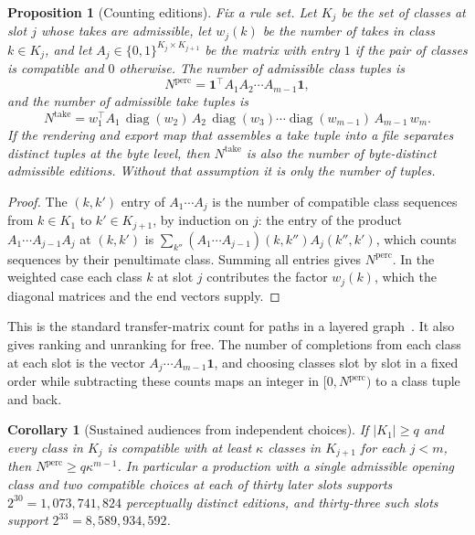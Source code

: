 \documentclass[11pt,twoside,openright]{book}
\theoremstyle{plain}
\newtheorem{proposition}[theorem]{Proposition}
\newtheorem{corollary}[theorem]{Corollary}
\theoremstyle{definition}
\theoremstyle{remark}
\newcommand{\one}{\mathbf{1}}
\DeclareMathOperator{\diag}{diag}
\begin{document}
\begin{proposition}[Counting editions]\label{prop:count}
Fix a rule set. Let $K_j$ be the set of classes at slot $j$ whose takes are admissible, let $w_j(k)$ be the number of takes in class $k\in K_j$, and let $A_j\in\{0,1\}^{K_j\times K_{j+1}}$ be the matrix with entry $1$ if the pair of classes is compatible and $0$ otherwise. The number of admissible class tuples is
\[
N^{\mathrm{perc}}=\one^{\!\top}A_1A_2\cdots A_{m-1}\one,
\]
and the number of admissible take tuples is
\[
N^{\mathrm{take}}=w_1^{\!\top}A_1\,\diag(w_2)\,A_2\,\diag(w_3)\cdots\diag(w_{m-1})\,A_{m-1}\,w_m .
\]
If the rendering and export map that assembles a take tuple into a file separates distinct tuples at the byte level, then $N^{\mathrm{take}}$ is also the number of byte-distinct admissible editions. Without that assumption it is only the number of tuples.
\end{proposition}

\begin{proof}
The $(k,k')$ entry of $A_1\cdots A_{j}$ is the number of compatible class sequences from $k\in K_1$ to $k'\in K_{j+1}$, by induction on $j$: the entry of the product $A_1\cdots A_{j-1}A_j$ at $(k,k')$ is $\sum_{k''}(A_1\cdots A_{j-1})(k,k'')A_j(k'',k')$, which counts sequences by their penultimate class. Summing all entries gives $N^{\mathrm{perc}}$. In the weighted case each class $k$ at slot $j$ contributes the factor $w_j(k)$, which the diagonal matrices and the end vectors supply.
\end{proof}

This is the standard transfer-matrix count for paths in a layered graph~\cite{stanley2012ec1}. It also gives ranking and unranking for free. The number of completions from each class at each slot is the vector $A_j\cdots A_{m-1}\one$, and choosing classes slot by slot in a fixed order while subtracting these counts maps an integer in $[0,N^{\mathrm{perc}})$ to a class tuple and back.

\begin{corollary}[Sustained audiences from independent choices]\label{cor:bound}
If $\lvert K_1\rvert\ge q$ and every class in $K_j$ is compatible with at least $\kappa$ classes in $K_{j+1}$ for each $j<m$, then $N^{\mathrm{perc}}\ge q\kappa^{m-1}$. In particular a production with a single admissible opening class and two compatible choices at each of thirty later slots supports $2^{30}=1{,}073{,}741{,}824$ perceptually distinct editions, and thirty-three such slots support $2^{33}=8{,}589{,}934{,}592$.
\end{corollary}
\end{document}
